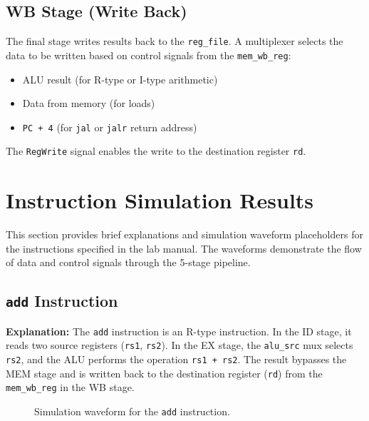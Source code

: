 \documentclass{article}
\begin{document}
\subsection{WB Stage (Write Back)}
The final stage writes results back to the \texttt{reg\_file}. A multiplexer selects the data to be written based on control signals from the \texttt{mem\_wb\_reg}:
\begin{itemize}
    \item ALU result (for R-type or I-type arithmetic)
    \item Data from memory (for loads)
    \item \texttt{PC + 4} (for \texttt{jal} or \texttt{jalr} return address)
\end{itemize}
The \texttt{RegWrite} signal enables the write to the destination register \texttt{rd}.

\section{Instruction Simulation Results}

This section provides brief explanations and simulation waveform placeholders for the instructions specified in the lab manual. The waveforms demonstrate the flow of data and control signals through the 5-stage pipeline.

\subsection{\texttt{add} Instruction}
\textbf{Explanation:} The \texttt{add} instruction is an R-type instruction. In the ID stage, it reads two source registers (\texttt{rs1}, \texttt{rs2}). In the EX stage, the \texttt{alu\_src} mux selects \texttt{rs2}, and the ALU performs the operation \texttt{rs1 + rs2}. The result bypasses the MEM stage and is written back to the destination register (\texttt{rd}) from the \texttt{mem\_wb\_reg} in the WB stage.

\begin{figure}[H]
    \centering
    \caption{Simulation waveform for the \texttt{add} instruction.}
    \label{fig:add_sim}
\end{figure}
\end{document}
